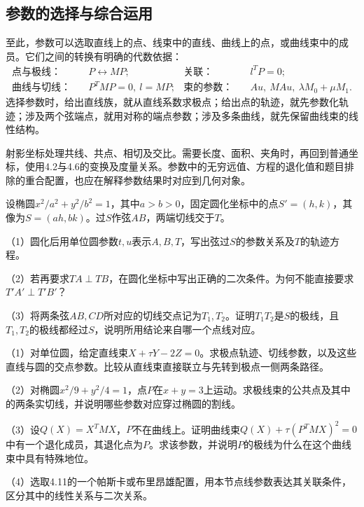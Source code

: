 \subsection{参数的选择与综合运用}

至此，参数可以选取直线上的点、线束中的直线、曲线上的点，或曲线束中的成员。它们之间的转换有明确的代数依据：
\begin{equation*}
 \begin{aligned}
 \text{点与极线：}&\quad P\longleftrightarrow MP;
 &\text{关联：}&\quad l^TP=0;\\
 \text{曲线与切线：}&\quad P^TMP=0,\ l=MP;
 &\text{束的参数：}&\quad Au,\ MAu,\ \lambda M_0+\mu M_1.
 \end{aligned}
\end{equation*}
选择参数时，给出直线族，就从直线系数求极点；给出点的轨迹，就先参数化轨迹；涉及两个弦端点，就用对称的端点参数；涉及多条曲线，就先保留曲线束的线性结构。

射影坐标处理共线、共点、相切及交比。需要长度、面积、夹角时，再回到普通坐标，使用4.2与4.6的变换及度量关系。参数中的无穷远值、方程的退化值和题目排除的重合配置，也应在解释参数结果时对应到几何对象。

\begin{example}
设椭圆\(x^2/a^2+y^2/b^2=1\)，其中\(a>b>0\)，固定圆化坐标中的点\(S'=(h,k)\)，其像为\(S=(ah,bk)\)。过\(S\)作弦\(AB\)，两端切线交于\(T\)。

（1）圆化后用单位圆参数\(t,u\)表示\(A,B,T\)，写出弦过\(S\)的参数关系及\(T\)的轨迹方程。

（2）若再要求\(TA\perp TB\)，在圆化坐标中写出正确的二次条件。为何不能直接要求\(T'A'\perp T'B'\)？

（3）将两条弦\(AB,CD\)所对应的切线交点记为\(T_1,T_2\)。证明\(T_1T_2\)是\(S\)的极线，且\(T_1,T_2\)的极线都经过\(S\)，说明所用结论来自哪一个点线对应。
\end{example}

\begin{exercise}
\mbox{}\par\nobreak

（1）对单位圆，给定直线束\(X+\tau Y-2Z=0\)。求极点轨迹、切线参数，以及这些直线与圆的交点参数。比较从直线束直接联立与先转到极点一侧两条路径。

（2）对椭圆\(x^2/9+y^2/4=1\)，点\(P\)在\(x+y=3\)上运动。求极线束的公共点及其中的两条实切线，并说明哪些参数对应穿过椭圆的割线。

（3）设\(Q(X)=X^TMX\)，\(P\)不在曲线上。证明曲线束\(Q(X)+\tau(P^TMX)^2=0\)中有一个退化成员，其退化点为\(P\)。求该参数，并说明\(P\)的极线为什么在这个曲线束中具有特殊地位。

（4）选取4.11的一个帕斯卡或布里昂雄配置，用本节点线参数表达其关联条件，区分其中的线性关系与二次关系。
\end{exercise}
